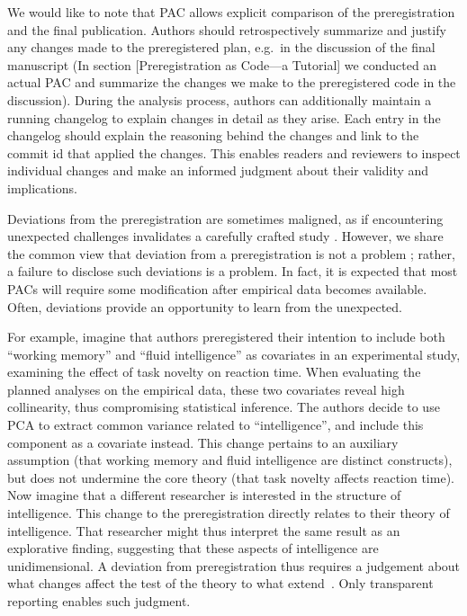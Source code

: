 \documentclass[psych,tutorial,accept,moreauthors,pdftex]{Definitions/mdpi}
\begin{document}
\begin{paracol}{2}
We would like to note that PAC allows explicit comparison of the
preregistration and the final publication. Authors should
retrospectively summarize and justify any changes made to the
preregistered plan, e.g.~in the discussion of the {final manuscript}
({In section {[}Preregistration as Code---a Tutorial{]} we
  conducted an actual PAC and summarize the changes we make to the
  preregistered code in the discussion}). During the analysis process,
authors can additionally maintain a running changelog to explain changes
in detail as they arise. Each entry in the changelog should explain the
reasoning behind the changes and link to the commit id that applied the
changes. This enables readers and reviewers to inspect individual
changes and make an informed judgment about their validity and
implications.

Deviations from the preregistration are sometimes maligned, as if
encountering unexpected challenges invalidates a carefully crafted study
\citep{szollosi_is_2020}. However, we share the common view that
deviation from a preregistration is not a problem
\citep{nosekPreregistrationHardWorthwhile2019}; rather, a failure to
disclose such deviations is a problem. In fact, it is expected that most
PACs will require some modification after empirical data becomes
available. Often, deviations provide an opportunity to learn from the
unexpected.

For example, imagine that authors preregistered their intention to
include both ``working memory'' and ``fluid intelligence'' as covariates
in an experimental study, examining the effect of task novelty on
reaction time. When evaluating the planned analyses on the empirical
data, these two covariates reveal high collinearity, thus compromising
statistical inference. The authors decide to use PCA to extract common
variance related to ``intelligence'', and include this component as a
covariate instead. This change pertains to an auxiliary assumption (that
working memory and fluid intelligence are distinct constructs), but does
not undermine the core theory (that task novelty affects reaction time).
Now imagine that a different researcher is interested in the structure
of intelligence. This change to the preregistration directly relates to
their theory of intelligence. That researcher might thus interpret the
same result as an explorative finding, suggesting that these aspects of
intelligence are unidimensional. A deviation from preregistration thus
requires a judgement about what changes affect the test of the theory to
what extend~\citep{meehlTheoreticalRisksTabular1978}. Only transparent
reporting enables such judgment.


\end{paracol}
\end{document}
